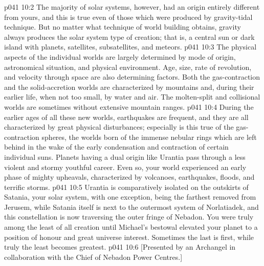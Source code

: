 \vs p041 10:2 The majority of solar systems, however, had an origin entirely different from yours, and this is true even of those which were produced by gravity\hyp{}tidal technique. But no matter what technique of world building obtains, gravity always produces the solar system type of creation; that is, a central sun or dark island with planets, satellites, subsatellites, and meteors.
\vs p041 10:3 \pc The physical aspects of the individual worlds are largely determined by mode of origin, astronomical situation, and physical environment. Age, size, rate of revolution, and velocity through space are also determining factors. Both the gas\hyp{}contraction and the solid\hyp{}accretion worlds are characterized by mountains and, during their earlier life, when not too small, by water and air. The molten\hyp{}split and collisional worlds are sometimes without extensive mountain ranges.
\vs p041 10:4 During the earlier ages of all these new worlds, earthquakes are frequent, and they are all characterized by great physical disturbances; especially is this true of the gas\hyp{}contraction spheres, the worlds born of the immense nebular rings which are left behind in the wake of the early condensation and contraction of certain individual suns. Planets having a dual origin like Urantia pass through a less violent and stormy youthful career. Even so, your world experienced an early phase of mighty upheavals, characterized by volcanoes, earthquakes, floods, and terrific storms.
\vs p041 10:5 \pc Urantia is comparatively isolated on the outskirts of Satania, your solar system, with one exception, being the farthest removed from Jerusem, while Satania itself is next to the outermost system of Norlatiadek, and this constellation is now traversing the outer fringe of Nebadon. You were truly among the least of all creation until Michael’s bestowal elevated your planet to a position of honour and great universe interest. Sometimes the last is first, while truly the least becomes greatest.
\vsetoff
\vs p041 10:6 [Presented by an Archangel in collaboration with the Chief of Nebadon Power Centres.]
\quizlink
